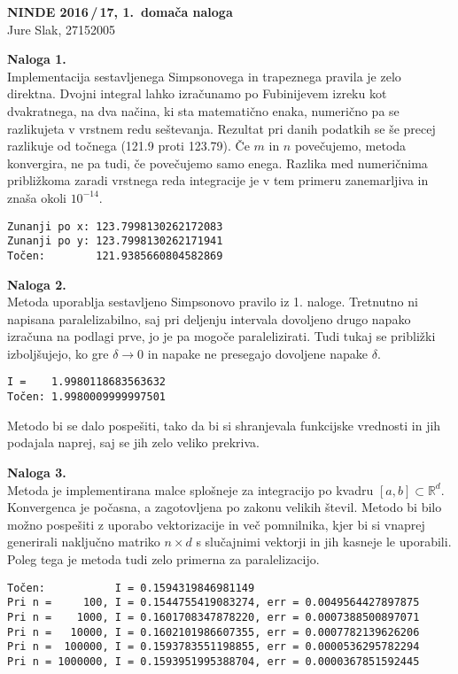 \documentclass[a4paper,oneside,12pt]{article}
\title{\Title}
\author{\Author}
\date{\today}
\theoremstyle{definition}
\newcommand{\R}{\ensuremath{\mathbb{R}}}
\newcommand{\Title}{NINDE 2016\,/\,17, 1.\ domača naloga}
\begin{document}
\begin{center}
  \textbf{\large \Title} \\[12pt]
  Jure Slak, 27152005
\end{center}

\textbf{Naloga 1.} \\
Implementacija sestavljenega Simpsonovega in trapeznega pravila je zelo
direktna. Dvojni integral lahko izračunamo po Fubinijevem izreku kot
dvakratnega, na dva načina, ki sta matematično enaka, numerično pa se
razlikujeta v vrstnem redu seštevanja. Rezultat pri danih podatkih se še precej
razlikuje od točnega (121.9 proti 123.79). Če $m$ in $n$ povečujemo, metoda
konvergira, ne pa tudi, če povečujemo samo enega. Razlika med numeričnima
približkoma zaradi vrstnega reda integracije je v tem primeru zanemarljiva in
znaša okoli $10^{-14}$.

\begin{verbatim}
Zunanji po x: 123.7998130262172083
Zunanji po y: 123.7998130262171941
Točen:        121.9385660804582869
\end{verbatim}

\textbf{Naloga 2.} \\
Metoda uporablja sestavljeno Simpsonovo pravilo iz 1. naloge. Tretnutno ni
napisana paralelizabilno, saj pri deljenju intervala dovoljeno drugo napako
izračuna na podlagi prve, jo je pa mogoče paralelizirati. Tudi tukaj se
približki izboljšujejo, ko gre $\delta \to 0$ in napake ne presegajo dovoljene
napake $\delta$.

\begin{verbatim}
I =    1.9980118683563632
Točen: 1.9980009999997501
\end{verbatim}

Metodo bi se dalo pospešiti, tako da bi si shranjevala funkcijske vrednosti in
jih podajala naprej, saj se jih zelo veliko prekriva.

\textbf{Naloga 3.} \\
Metoda je implementirana malce splošneje za integracijo po kvadru $[a, b]
\subset \R^d$. Konvergenca je počasna, a zagotovljena po zakonu velikih števil.
Metodo bi bilo možno pospešiti z uporabo vektorizacije in več pomnilnika,
kjer bi si vnaprej generirali naključno matriko $n \times d$ s slučajnimi vektorji
in jih kasneje le uporabili. Poleg tega je metoda tudi zelo primerna za
paralelizacijo.

\begin{verbatim}
Točen:           I = 0.1594319846981149
Pri n =     100, I = 0.1544755419083274, err = 0.0049564427897875
Pri n =    1000, I = 0.1601708347878220, err = 0.0007388500897071
Pri n =   10000, I = 0.1602101986607355, err = 0.0007782139626206
Pri n =  100000, I = 0.1593783551198855, err = 0.0000536295782294
Pri n = 1000000, I = 0.1593951995388704, err = 0.0000367851592445
\end{verbatim}
\end{document}
